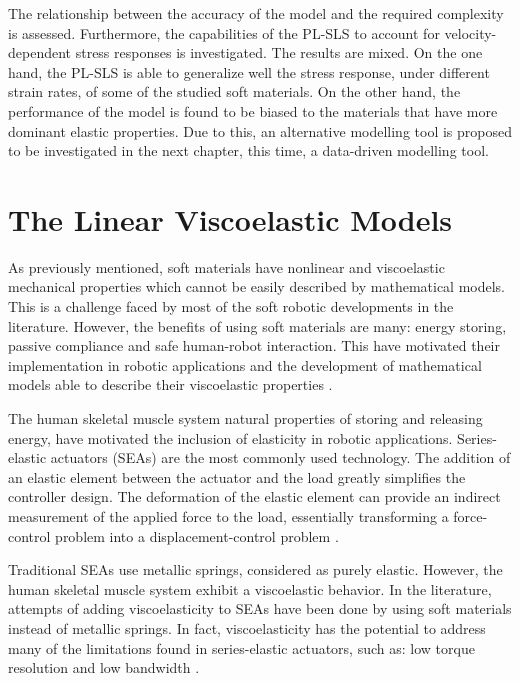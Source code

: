 The relationship between the accuracy of the model and the required complexity is assessed. Furthermore, the capabilities of the PL-SLS to account for velocity-dependent stress responses is investigated. The results are mixed. On the one hand, the PL-SLS is able to generalize well the stress response, under different strain rates, of some of the studied soft materials. On the other hand, the performance of the model is found to be biased to the materials that have more dominant elastic properties. Due to this, an alternative modelling tool is proposed to be investigated in the next chapter, this time, a data-driven modelling tool.

\section{The Linear Viscoelastic Models}

As previously mentioned, soft materials have nonlinear and viscoelastic mechanical properties which cannot be easily described by mathematical models. This is a challenge faced by most of the soft robotic developments in the literature. However, the benefits of using soft materials are many: energy storing, passive compliance and safe human-robot interaction. This have motivated their implementation in robotic applications and the development of mathematical models able to describe their viscoelastic properties \cite{lee2017soft}.

The human skeletal muscle system natural properties of storing and releasing energy, have motivated the inclusion of elasticity in robotic applications. Series-elastic actuators (SEAs) are the most commonly used technology. The addition of an elastic element between the actuator and the load greatly simplifies the controller design. The deformation of the elastic element can provide an indirect measurement of the applied force to the load, essentially transforming a force-control problem into a displacement-control problem \cite{agarwal2017series}. 

Traditional SEAs use metallic springs, considered as purely elastic. However, the human skeletal muscle system exhibit a viscoelastic behavior. In the literature, attempts of adding viscoelasticity to SEAs have been done by using soft materials instead of metallic springs. In fact, viscoelasticity has the potential to address many of the limitations found in series-elastic actuators, such as: low torque resolution and low bandwidth \cite{martins2015polyurethane,tagliamonte2014rendering,schepelmann2014compact}. 


